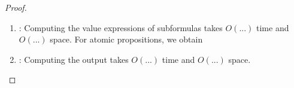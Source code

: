 \begin{proof}
\begin{enumerate}
		
		\item \TODO:
		Computing the value expressions of subformulas takes $O(...)$ time %
		and $O(...)$ space. %
		For atomic propositions, we obtain 
		
		
		
		\item \TODO:
		Computing the output takes $O(...)$ time %
		and $O(...)$ space. %
	\end{enumerate}
	
%	
%	
	
%	
%	
%	
%	
%	
\end{proof}